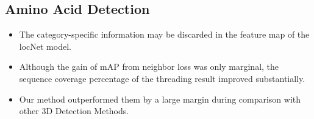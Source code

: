 \documentclass[final, xcolor=cmyk]{beamer}
\begin{document}
\begin{poster}
\subsection{Amino Acid Detection}
\begin{figure}[!htbp]
    

\end{figure}
\begin{itemize}
    \item The category-specific information may be discarded in the feature map of the locNet model.
    \item Although the gain of mAP from neighbor loss was only marginal, the sequence coverage percentage of the threading result improved substantially.
    \item Our method outperformed them by a large margin during comparison with other 3D Detection Methods.
\end{itemize}

\end{poster}
\end{document}
